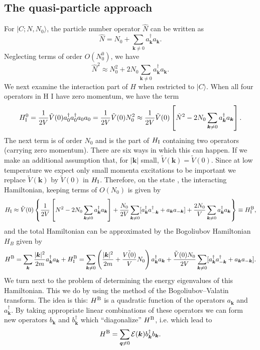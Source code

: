 \subsection{The quasi-particle approach}
For $|C;N,N_0\rangle$, the particle number operator $\hat{N}$ can be written as
\[\hat{N} = N_0 + \sum_{\bm{k}\neq 0}a_{\bm{k}}^{\dagger} a_{\bm{k}} .\]
Neglecting terms of order $O(N_0^0)$, we have
\[\hat{N}^2 \approx N_0^2 + 2N_0\sum_{\bm{k}\neq 0}a_{\bm{k}}^{\dagger} a_{\bm{k}} .\]
We next examine the interaction part of $H$ when restricted to $|C\rangle$. When all four operators in H I have zero momentum, we have the term
\[H_{\rm I}^0 = \frac{1}{2V} \tilde{V}(0) a^{\dagger}_{0} a^{\dagger}_{0} a_{0} a_{0} = \frac{1}{2V}\tilde{V}(0)N_0^2 \approx  \frac{1}{2V}\tilde{V}(0) \left[\hat{N}^2-2N_0\sum_{\bm{k}\neq 0}a_{\bm{k}}^{\dagger} a_{\bm{k}} \right].\]
The next term is of order $N_0$ and is the part of $H_{\rm I}$ containing two operators (carrying zero momentum). There are six ways in which this can happen. If we make an additional assumption that, for $|\bm{k}|$ small, $\tilde{V}(\bm{k}) = \tilde{V}(0)$. 
Since at low temperature we expect only small momenta excitations to be important we replace $\tilde{V}(\bm{k})$ by $\tilde{V}(0)$ in $H_{\rm I}$. Therefore, on the state , the interacting Hamiltonian, keeping terms of $O(N_0)$ is given by
\[H_{\rm I} \approx \tilde{V}(0) \left\{ \frac{1}{2V}\left[N^2-2N_0\sum_{\bm{k}\neq 0}a_{\bm{k}}^{\dagger} a_{\bm{k}} \right]  +\frac{N_0}{2V}\sum_{\bm{k}\neq 0} [a^{\dagger}_{\bm{k}} a^{\dagger}_{-\bm{k}} + a_{\bm{k}} a_{-\bm{k}}] +\frac{2N_0}{V} \sum_{\bm{k}\neq 0}a_{\bm{k}}^{\dagger} a_{\bm{k}} \right\} \equiv H_{\rm I}^{\rm B} ,\] 
and the total Hamiltonian can be approximated by the Bogoliubov Hamiltonian $H_B$ given by
\[H^{\rm B} = \sum_{\bm{k}} \frac{|\bm{k}|^2}{2m} a_{\bm{k}}^{\dagger} a_{\bm{k}} + H_{\rm I}^{\rm B} = \sum_{\bm{k}\neq 0} \left(\frac{|\bm{k}|^2}{2m} + \frac{\tilde{V(0)}}{V}N_0 \right)a_{\bm{k}}^{\dagger} a_{\bm{k}}  + \frac{\tilde{V}(0)N_0}{2V} \sum_{\bm{k}\neq 0} [a^{\dagger}_{\bm{k}} a^{\dagger}_{-\bm{k}} + a_{\bm{k}} a_{-\bm{k}}].\]
We turn next to the problem of determining the energy eigenvalues of this Hamiltonian. This we do by using the method of the Bogoliubov–Valatin transform. 
The idea is this: $H^{\rm B}$ is a quadratic function of the operators $a_{\bm{k}}$ and $a^{\dagger}_{\bm{k}}$. 
By taking appropriate linear combinations of these operators we can form new operators $b_{\bm{k}}$ and $b^{\dagger}_{\bm{k}}$ which ``diagonalize'' $H^{\rm B}$, i.e. which lead to
\[H^{\rm B} = \sum_{\bm{q} \neq 0} \mathcal{E}(\bm{k})b^{\dagger}_{\bm{k}} b_{\bm{k}} .\]
